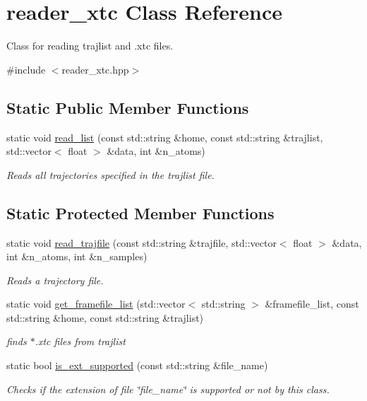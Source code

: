 \hypertarget{classreader__xtc}{}\section{reader\+\_\+xtc Class Reference}
\label{classreader__xtc}


Class for reading trajlist and .xtc files.  




{\ttfamily \#include $<$reader\+\_\+xtc.\+hpp$>$}

\subsection*{Static Public Member Functions}
\begin{DoxyCompactItemize}
\item 
static void \hyperlink{classreader__xtc_a95962f3a2603a7c75d61dd0e7b2933d2}{read\+\_\+list} (const std\+::string \&home, const std\+::string \&trajlist, std\+::vector$<$ float $>$ \&data, int \&n\+\_\+atoms)
\begin{DoxyCompactList}\small\item\em Reads all trajectories specified in the trajlist file. \end{DoxyCompactList}\end{DoxyCompactItemize}
\subsection*{Static Protected Member Functions}
\begin{DoxyCompactItemize}
\item 
static void \hyperlink{classreader__xtc_a591fc1a28d5d4abf353c530180f27a72}{read\+\_\+trajfile} (const std\+::string \&trajfile, std\+::vector$<$ float $>$ \&data, int \&n\+\_\+atoms, int \&n\+\_\+samples)
\begin{DoxyCompactList}\small\item\em Reads a trajectory file. \end{DoxyCompactList}\item 
static void \hyperlink{classreader__xtc_a40b1f183702ef6ebf612bfd2765d40f3}{get\+\_\+framefile\+\_\+list} (std\+::vector$<$ std\+::string $>$ \&framefile\+\_\+list, const std\+::string \&home, const std\+::string \&trajlist)
\begin{DoxyCompactList}\small\item\em finds $\ast$.xtc files from trajlist \end{DoxyCompactList}\item 
static bool \hyperlink{classreader__xtc_a094c8a732a02a3f231f308ec98aeab1b}{is\+\_\+ext\+\_\+supported} (const std\+::string \&file\+\_\+name)
\begin{DoxyCompactList}\small\item\em Checks if the extension of file \char`\"{}file\+\_\+name\char`\"{} is supported or not by this class. \end{DoxyCompactList}\end{DoxyCompactItemize}


